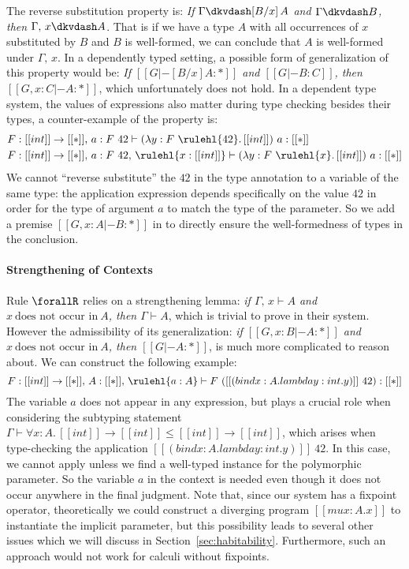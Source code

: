 The reverse substitution property is:
\emph{If $\Gamma \dkvdash [B / x] \, A$ and $\Gamma \dkvdash B$, then $\Gamma,\, x \dkvdash A$}.
That is if we have a type $A$ with all occurrences of $x$ substituted by $B$ and $B$
is well-formed, we can conclude that $A$ is well-formed under $\Gamma,\, x$.
In a dependently typed setting, a possible form of generalization of this property
would be:
\emph{If $[[G |- [B / x] A : *]]$ and $[[G |- B : C]]$, then $[[G , x : C |- A : *]]$},
which unfortunately does not hold.
In a dependent type system, the values of expressions also matter during type checking
besides their types, a counter-example of the property is:
\begin{align*}
& F : [[int]] \rightarrow [[*]],\, a : F~42  \vdash (\lambda y : F~\rulehl{42}.\, [[int]]) ~ a : [[*]] \\
& F : [[int]] \rightarrow [[*]],\, a : F~42  ,\, \rulehl{x : [[int]]} \vdash (\lambda y : F~\rulehl{x}.\, [[int]]) ~ a : [[*]]
\end{align*}
We cannot ``reverse substitute'' the $42$ in the type annotation to a variable
of the same type: the application expression depends specifically on the value
$42$ in order for the type of argument $a$ to match the type of the parameter.
So we add a premise $[[G , x : A |- B : *]]$ in  to directly
ensure the well-formedness of types in the conclusion.

\paragraph*{Strengthening of Contexts}
\label{sec:strengthening}

Rule $\forallR$ relies on a strengthening lemma:
\emph{if $\Gamma,\, x \vdash A$ and $x ~\text{does not occur in}~ A$, then $\Gamma \vdash A$}, which
is trivial to prove in their system.
However the admissibility of its generalization:
\emph{if $[[G, x : B |- A : *]]$ and $x ~\text{does not occur in}~ A$, then $[[G |- A : *]]$},
is much more complicated to reason about. We can construct the following example:
\begin{equation*}
    F : [[int]] \rightarrow [[*]],\, A : [[*]],\, \rulehl{a : A} \vdash F ~ ([[(bind x : A. lambda y : int. y)]]~ 42) : [[*]]
\end{equation*}
The variable $a$ does not appear in any expression, but plays a
crucial role when considering the subtyping statement
$\Gamma \vdash \forall x : A.\, [[int]] \rightarrow [[int]] \le [[int]] \rightarrow [[int]]$,
which arises when type-checking the application $[[(bind x : A. lambda y : int. y)]]~42$.
In this case, we cannot apply  unless we find a
well-typed instance for the polymorphic parameter. So the variable $a$ in the context
is needed even though it does not occur anywhere in the final judgment.
Note that, since our system has a fixpoint operator, theoretically we could construct
a diverging program $[[mu x : A. x]]$ to instantiate the implicit parameter, but
this possibility leads to several other issues which we will discuss in
Section~\ref{sec:habitability}. Furthermore, such an approach would not work for calculi
without fixpoints.

